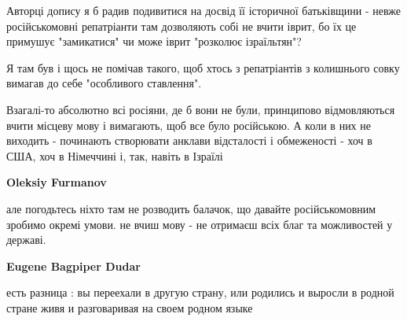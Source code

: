 \begin{itemize}
 

Авторці допису я б радив подивитися на досвід її історичної батьківщини - невже
російськомовні репатріанти там дозволяють собі не вчити іврит, бо їх це
примушує "замикатися" чи може іврит "розколює ізраїльтян"?

Я там був і щось не помічав такого, щоб хтось з репатріантів з колишнього совку
вимагав до себе "особливого ставлення".

\begin{itemize}
 

Взагалі-то абсолютно всі росіяни, де б вони не були, принципово відмовляються
вчити місцеву мову і вимагають, щоб все було російською. А коли в них не
виходить - починають створювати анклави відсталості і обмеженості - хоч в США,
хоч в Німеччині і, так, навіть в Ізраїлі


 
\textbf{Oleksiy Furmanov} 

але погодьтесь ніхто там не розводить балачок, що давайте російськомовним
зробимо окремі умови. не вчиш мову - не отримаєш всіх благ та можливостей у
державі.


 
\textbf{Eugene Bagpiper Dudar} 

есть разница : вы переехали в другую страну, или родились и выросли в родной
стране живя и разговаривая на своем родном языке

 

\end{itemize}
\end{itemize}
